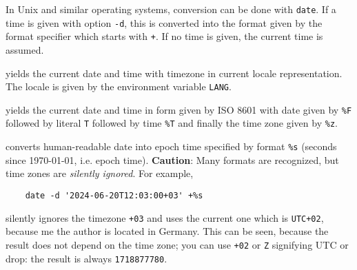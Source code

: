 \documentclass[a4paper, english]{article}%
\begin{document}
In Unix and similar operating systems, conversion can be done with \texttt{date}. 
If a time is given with option \texttt{-d}, 
this is converted into the format given by the format specifier which starts with \texttt{+}. 
If no time is given, the current time is assumed. 
%
\begin{description}[style=nextline]
  \item[\texttt{date}] 
  yields the current date and time with timezone in current locale representation. 
  The locale is given by the environment variable \texttt{LANG}. 
  \item[\texttt{date +\%FT\%T\%z}] 
  yields the current date and time 
  in form given by ISO 8601 with date given by \texttt{\%F} followed by literal \texttt{T} 
  followed by time \texttt{\%T} and finally the time zone given by \texttt{\%z}. 
  \item[\texttt{date -d 'Apr 29 2024' +\%s}] 
  converts human-readable date into epoch time specified by format \texttt{\%s} 
  (seconds since 1970-01-01, i.e. epoch time). 
  \textbf{Caution}: Many formats are recognized, but time zones are \emph{silently ignored}. 
  For example, 
  \begin{verbatim}
    date -d '2024-06-20T12:03:00+03' +%s
  \end{verbatim}
  silently ignores the timezone \texttt{+03} 
  and uses the current one which is \texttt{UTC+02}, because me the author is located in Germany. 
  This can be seen, because the result does not depend on the time zone; 
  you can use \texttt{+02} or \texttt{Z} signifying UTC or drop: 
  the result is always \texttt{1718877780}. 
  

\end{description}
\end{document}
